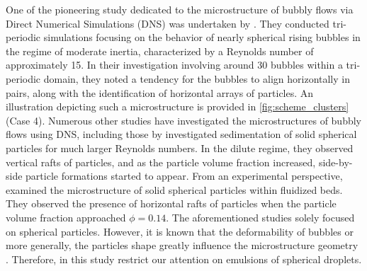 One of the pioneering study dedicated to the microstructure of bubbly flows via Direct Numerical Simulations (DNS) was undertaken by \citet{bunner2002dynamics}. 
They conducted tri-periodic simulations focusing on the behavior of nearly spherical rising bubbles in the regime of moderate inertia, characterized by a Reynolds number of approximately 15. 
In their investigation involving around 30 bubbles within a tri-periodic domain, they noted a tendency for the bubbles to align horizontally in pairs, along with the identification of horizontal arrays of particles. 
An illustration depicting such a microstructure is provided in \ref{fig:scheme_clusters} (Case 4). 
Numerous other studies have investigated the microstructures of bubbly flows using DNS, including those by \citet{yin2008lattice,roghair2011drag,zhang2023evolution}
\citet{shajahan2023inertial} investigated sedimentation of solid spherical particles for much larger Reynolds numbers.
In the dilute regime, they observed vertical rafts of particles, and as the particle volume fraction increased, side-by-side particle formations started to appear. 
From an experimental perspective, \citet{almeras2021statistics} examined the microstructure of solid spherical particles within fluidized beds.
They observed the presence of horizontal rafts of particles when the particle volume fraction approached $\phi = 0.14$.
The aforementioned studies solely focused on spherical particles.
However, it is known that the deformability of bubbles or more generally, the particles shape  greatly influence the microstructure geometry \citet{bunner2003effect,seyed2021sedimentation}. 
Therefore, in this study restrict our attention on emulsions of spherical droplets. 

